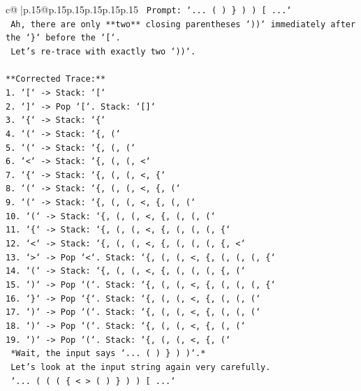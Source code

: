 \documentclass{article}
\begin{document}
{\begin{supertabular}{c@{$\;$}|p{.15\linewidth}@{}p{.15\linewidth}p{.15\linewidth}p{.15\linewidth}p{.15\linewidth}p{.15\linewidth}}
{{{\texttt{          Prompt: `... ( ) \} ) ) {[} ...`} \\
\texttt{          Ah, there are only **two** closing parentheses `))` immediately after the `\}` before the `{[}`.} \\
\texttt{          Let's re{-}trace with exactly two `))`.} \\
\\ 
\texttt{**Corrected Trace:**} \\
\texttt{1. `{[}` {-}> Stack: `{[}`} \\
\texttt{2. `{]}` {-}> Pop `{[}`. Stack: `{[}{]}`} \\
\texttt{3. `\{` {-}> Stack: `\{`} \\
\texttt{4. `(` {-}> Stack: `\{, (`} \\
\texttt{5. `(` {-}> Stack: `\{, (, (`} \\
\texttt{6. `<` {-}> Stack: `\{, (, (, <`} \\
\texttt{7. `\{` {-}> Stack: `\{, (, (, <, \{`} \\
\texttt{8. `(` {-}> Stack: `\{, (, (, <, \{, (`} \\
\texttt{9. `(` {-}> Stack: `\{, (, (, <, \{, (, (`} \\
\texttt{10. `(` {-}> Stack: `\{, (, (, <, \{, (, (, (`} \\
\texttt{11. `\{` {-}> Stack: `\{, (, (, <, \{, (, (, (, \{`} \\
\texttt{12. `<` {-}> Stack: `\{, (, (, <, \{, (, (, (, \{, <`} \\
\texttt{13. `>` {-}> Pop `<`. Stack: `\{, (, (, <, \{, (, (, (, \{`} \\
\texttt{14. `(` {-}> Stack: `\{, (, (, <, \{, (, (, (, \{, (`} \\
\texttt{15. `)` {-}> Pop `(`. Stack: `\{, (, (, <, \{, (, (, (, \{`} \\
\texttt{16. `\}` {-}> Pop `\{`. Stack: `\{, (, (, <, \{, (, (, (`} \\
\texttt{17. `)` {-}> Pop `(`. Stack: `\{, (, (, <, \{, (, (, (`} \\
\texttt{18. `)` {-}> Pop `(`. Stack: `\{, (, (, <, \{, (, (`} \\
\texttt{19. `)` {-}> Pop `(`. Stack: `\{, (, (, <, \{, (`} \\
\texttt{   *Wait, the input says `... ( ) \} ) )`.*} \\
\texttt{   Let's look at the input string again very carefully.} \\
\texttt{   `... ( ( ( \{ < > ( ) \} ) ) {[} ...`} \\
}}}
\end{supertabular}}
\end{document}
